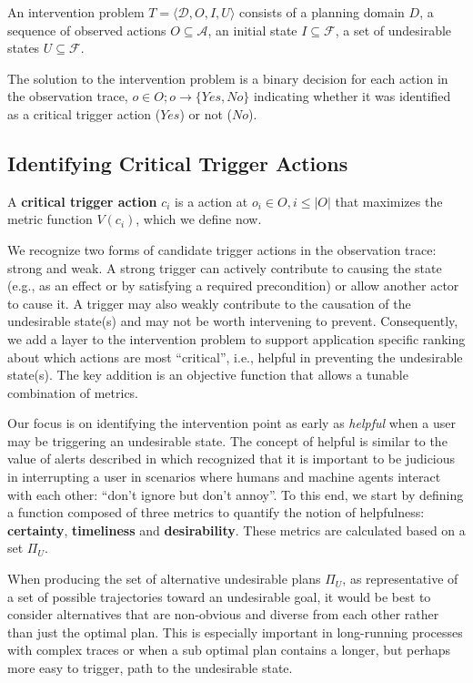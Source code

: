 \begin{definition}
An intervention problem $T = \langle \mathcal{D}, O, I, U \rangle$ consists of a planning domain $D$, a sequence of observed actions  $O \subseteq \mathcal{A}$, an initial state $I \subseteq \mathcal{F}$, a set of undesirable states $U\subseteq \mathcal{F}$.
\end{definition}
The solution to the intervention problem is a binary decision for each action in the observation trace, $o \in O;  o \rightarrow \lbrace Yes, No \rbrace$ indicating whether it was identified as a critical trigger action ($Yes$) or not ($No$).


\subsection{Identifying Critical Trigger Actions}
A \textbf{critical trigger action} $c_i$ is a  action at $o_i \in O, i\leq |O|$ that maximizes the metric function $V (c_i)$, which we define now.

We recognize two forms of candidate trigger actions in the observation trace: strong and weak. 
A strong trigger can actively contribute to causing the state (e.g., as an effect or by satisfying a required precondition) or allow another actor to cause it. 
A trigger may also weakly contribute to the causation of the undesirable state(s) and may not be worth intervening to prevent. 
Consequently, we add a layer to the intervention problem to support application specific ranking about which actions are most ``critical'', i.e., helpful in preventing the undesirable state(s). 
The key addition is an objective function that allows a tunable combination of metrics.

Our focus is on identifying the intervention point as early as  \textit{helpful} when a user may be triggering an undesirable state. 
The concept of helpful is similar to the value of alerts described in \cite{Wilkins2003} which recognized that it is important to be judicious in interrupting a user in scenarios where humans and machine agents interact with each other: ``don't ignore but don't annoy''. 
To this end, we start by defining a function composed of three  metrics to quantify the notion of helpfulness: \textbf{certainty}, \textbf{timeliness} and \textbf{desirability}. 
These metrics are calculated based on a set $\Pi_U$.


When producing the set of alternative undesirable plans $\Pi_U$, as representative of a set of possible trajectories toward an undesirable goal, it would be best to consider alternatives that are non-obvious and diverse from each other rather than just the optimal plan.  
This is especially important in long-running processes with complex traces or when a sub optimal plan contains a longer, but perhaps more easy to trigger, path to the undesirable state.


